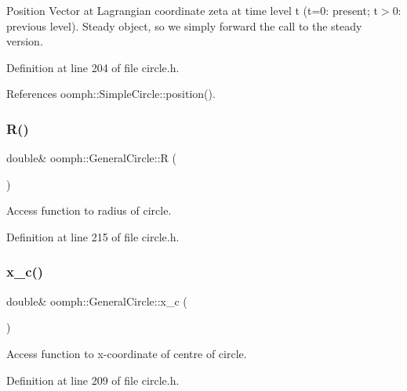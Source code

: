 Position Vector at Lagrangian coordinate zeta at time level t (t=0\+: present; t$>$0\+: previous level). Steady object, so we simply forward the call to the steady version. 



Definition at line 204 of file circle.\+h.



References oomph\+::\+Simple\+Circle\+::position().

\mbox{\label{classoomph_1_1GeneralCircle_adc9df8b14326bddb144231b0be5d06c0}} 
\subsubsection{\texorpdfstring{R()}{R()}}
{\footnotesize\ttfamily double\& oomph\+::\+General\+Circle\+::R (\begin{DoxyParamCaption}{ }\end{DoxyParamCaption})\hspace{0.3cm}{\ttfamily [inline]}}



Access function to radius of circle. 



Definition at line 215 of file circle.\+h.

\mbox{\label{classoomph_1_1GeneralCircle_a9c84564d8239bd8b4a2b28649638dd4a}} 
\subsubsection{\texorpdfstring{x\+\_\+c()}{x\_c()}}
{\footnotesize\ttfamily double\& oomph\+::\+General\+Circle\+::x\+\_\+c (\begin{DoxyParamCaption}{ }\end{DoxyParamCaption})\hspace{0.3cm}{\ttfamily [inline]}}



Access function to x-\/coordinate of centre of circle. 



Definition at line 209 of file circle.\+h.

